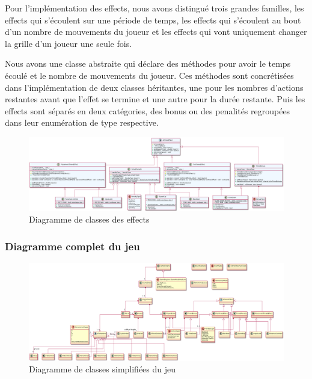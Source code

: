 \documentclass{article}
\begin{document}
Pour l'implémentation des effects, nous avons distingué trois grandes familles, les effects qui s'écoulent sur une période de temps, les effects qui s'écoulent au bout d'un nombre de mouvements du joueur et les effects qui vont uniquement changer la grille d'un joueur une seule fois.

Nous avons une classe abstraite qui déclare des méthodes pour avoir le temps écoulé et le nombre de mouvements du joueur. Ces méthodes sont concrétisées dans l'implémentation de deux classes héritantes, une pour les nombres d'actions restantes avant que l'effet se termine et une autre pour la durée restante. Puis les effects sont séparés en deux catégories, des bonus ou des penalités regroupées dans leur enumération de type respective. 

\begin{figure}[H]
    \centering
    \includegraphics[scale=0.3, angle=90]{../../res/uml/class/EffectClass.png}
    \caption{Diagramme de classes des effects}
    \label{fig:EffectDiagramm}
\end{figure}

\subsubsection{Diagramme complet du jeu}

\begin{figure}[H]
    \centering
    \includegraphics[scale=0.3, angle=90]{../../res/uml/class/GameStructureClass.png}
    \caption{Diagramme de classes simplifiées du jeu}
    \label{fig:WholeGameDiagramm}
\end{figure}
\end{document}
